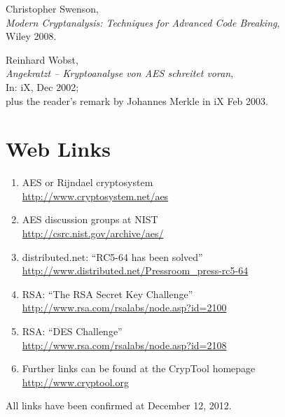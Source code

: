 \begin{thebibliography}{99999}
  
       Christopher Swenson, \\
       {\em Modern Cryptanalysis: Techniques for Advanced Code Breaking}, \\
       Wiley 2008.

  
       Reinhard Wobst, \\
       {\em Angekratzt -- Kryptoanalyse von AES schreitet voran}, \\
       In: iX, Dec 2002; \\
       plus the reader's remark by Johannes Merkle in iX Feb 2003.

\end{thebibliography}



\newpage
\chapter*{Web Links}

\begin{enumerate}

  \hypertarget{CM_HT_Weblink_Rijndael-Cryptosystem}{}
  \item AES or Rijndael cryptosystem \\
        \url{http://www.cryptosystem.net/aes}

  \item AES discussion groups at NIST \\
	\url{http://csrc.nist.gov/archive/aes/}

  \item distributed.net: ``RC5-64 has been solved'' \\
        \url{http://www.distributed.net/Pressroom_press-rc5-64}

  \item RSA: ``The RSA Secret Key Challenge'' \\
        \url{http://www.rsa.com/rsalabs/node.asp?id=2100}

  \item RSA: ``DES Challenge'' \\
        \url{http://www.rsa.com/rsalabs/node.asp?id=2108}

  \item Further links can be found at the CrypTool homepage \\
        \url{http://www.cryptool.org}
	       
\end{enumerate}

All links have been confirmed at December 12, 2012.



